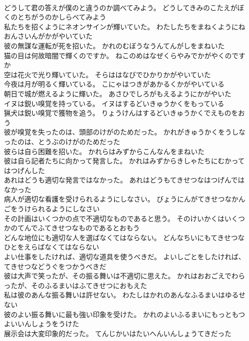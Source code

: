 \documentclass[8pt]{extreport}
\begin{document}
\begin{CJK}{UTF8}{min}
\\	どうして君の答えが僕のと違うのか調べてみよう。	どうしてきみのこたえがぼくのとちがうのかしらべてみよう 
\\	私たちを招くようにネオンサインが輝いていた。	わたしたちをまねくようにねおんさいんがかがやいていた 
\\	彼の無謀な運転が死を招いた。	かれのむぼうなうんてんがしをまねいた 
\\	猫の目は何故暗闇で輝くのですか。	ねこのめはなぜくらやみでかがやくのですか 
\\	空は花火で光り輝いていた。	そらははなびでひかりかがやいていた 
\\	今夜は月が明るく輝いている。	こにゃはつきがあかるくかがやいている 
\\	朝日で城が燃えるように輝いた。	あさひでしろがもえるようにかがやいた 
\\	イヌは鋭い嗅覚を持っている。	イヌはするどいきゅうかくをもっている 
\\	猟犬は鋭い嗅覚で獲物を追う。	りょうけんはするどいきゅうかくでえものをおう 
\\	彼が嗅覚を失ったのは、頭部のけがのためだった。	かれがきゅうかくをうしなったのは、とうぶのけがのためだった 
\\	彼らは自ら困難を招いた。	かれらはみずからこんなんをまねいた 
\\	彼は自ら記者たちに向かって発言した。	かれはみずからきしゃたちにむかってはつげんした 
\\	あれはどうも適切な発言ではなかった。	あれはどうもてきせつなはつげんではなかった 
\\	病人が適切な看護を受けられるようにしなさい。	びょうにんがてきせつなかんごをうけられるようにしなさい 
\\	その計画はいくつかの点で不適切なものであると思う。	そのけいかくはいくつかのてんでふてきせつなものであるとおもう 
\\	どんな地位にも適切な人を選ばなくてはならない。	どんなちいにもてきせつなひとをえらばなくてはならない 
\\	よい仕事をしたければ、適切な道具を使うべきだ。	よいしごとをしたければ、てきせつなどうぐをつかうべきだ 
\\	彼は大声で笑ったが、その振る舞いは不適切に思えた。	かれはおおごえでわらったが、そのふるまいはふてきせつにおもえた 
\\	私は彼のあんな振る舞いは許せない。	わたしはかれのあんなふるまいはゆるせない 
\\	彼のよい振る舞いに最も強い印象を受けた。	かれのよいふるまいにもっともつよいいんしょうをうけた 
\\	展示会は大変印象的だった。	てんじかいはたいへんいんしょうてきだった 

\end{CJK}
\end{document}
